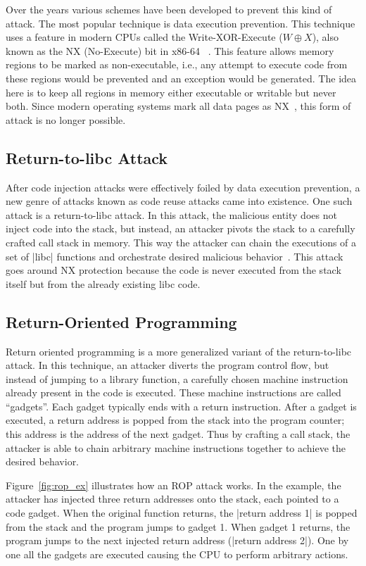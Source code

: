 Over the years various schemes have been developed to prevent this kind of attack. The most popular technique is data execution prevention. This technique uses a feature in modern CPUs called the Write-XOR-Execute ($W\oplus X$), also known as the NX (No-Execute) bit in x86-64 ~\cite{NXLINUX}. This feature allows memory regions to be marked as non-executable, i.e., any attempt to execute code from these regions would be prevented and an exception would be generated. The idea here is to keep all regions in memory either executable or writable but never both. Since modern operating systems mark all data pages as NX~\cite{UBUNTUNX}, this form of attack is no longer possible.

\subsection{Return-to-libc Attack}
After code injection attacks were effectively foiled by data execution prevention, a new genre of attacks known as code reuse attacks came into existence. One such attack is a return-to-libc attack. In this attack, the malicious entity does not inject code into the stack, but instead, an attacker pivots the stack to a carefully crafted call stack in memory. This way the attacker can chain the executions of a set of |libc| functions and orchestrate desired malicious behavior~\cite{nergal}. This attack goes around NX protection because the code is never executed from the stack itself but from the already existing libc code.

\subsection{Return-Oriented Programming}
Return oriented programming is a more generalized variant of the return-to-libc attack. In this technique, an attacker diverts the program control flow, but instead of jumping to a library function, a carefully chosen machine instruction already present in the code is executed. These machine instructions are called ``gadgets''. Each gadget typically ends with a return instruction. After a gadget is executed, a return address is popped from the stack into the program counter; this address is the address of the next gadget. Thus by crafting a call stack, the attacker is able to chain arbitrary machine instructions together to achieve the desired behavior. 

Figure~\ref{fig:rop_ex} illustrates how an ROP attack works. In the example, the attacker has injected three return addresses onto the stack, each pointed to a code gadget. When the original function returns, the |return address 1| is popped from the stack and the program jumps to gadget 1. When gadget 1 returns, the program jumps to the next injected return address (|return address 2|). One by one all the gadgets are executed causing the CPU to perform arbitrary actions.

